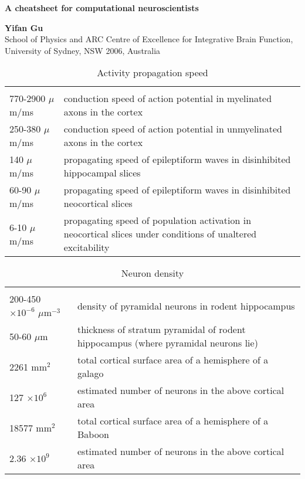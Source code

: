\documentclass[a4paper, 10pt]{article}
\begin{document}
{\centering\doublespacing
\Large{\textbf{A cheatsheet for computational neuroscientists}} 

\normalsize{\textbf{Yifan Gu} \\
\small{{School of Physics and ARC Centre of Excellence for Integrative Brain Function, \\
University of Sydney, NSW 2006, Australia} }	
\date{\today} 
\par
}
}


\begin{table}[h]
\captionsetup{font=small}
\footnotesize
\centering
\begin{tabular}[c]{p{3cm}p{6cm}}
\hline \\
770-2900 $\mu$m/ms &  conduction speed of action potential in myelinated axons in the cortex  \cite{debanne2011axon} \\
250-380 $\mu$m/ms & conduction speed of action potential in unmyelinated axons in the cortex  \cite{debanne2011axon} \\
140 $\mu$m/ms &  propagating speed of epileptiform waves in disinhibited hippocampal slices  \cite{miles1988spread} \\
60-90 $\mu$m/ms &  propagating speed of epileptiform waves in disinhibited neocortical slices  \cite{pinto2005initiation, chervin1988periodicity} \\
6-10 $\mu$m/ms & propagating speed of population activation in neocortical slices under conditions of
unaltered excitability   \cite{wu1999propagating} \\
\hline
\end{tabular}
\caption{Activity propagation speed}
\end{table}


\begin{table}[h]
\captionsetup{font=small}
\footnotesize
\centering
\begin{tabular}[c]{p{3cm}p{6cm}}
\hline \\
200-450 $\times 10^{-6}$  $\mu$m$^{-3}$ & density of pyramidal neurons in rodent hippocampus \cite{jinno2010stereological} \\
50-60  $\mu$m & thickness of stratum pyramidal of rodent hippocampus (where pyramidal neurons lie) \cite{ghafari2014prenatal} \\
2261 mm$^2$ & total cortical surface area of a hemisphere of a galago \citep{collins2010neuron} \\
127 $\times 10^{6}$ & estimated number of neurons in the above cortical area \citep{collins2010neuron} \\
18577 mm$^2$ & total cortical surface area of a hemisphere of a Baboon \citep{collins2010neuron} \\
2.36 $\times 10^{9}$ & estimated number of neurons in the above cortical area \citep{collins2010neuron} \\
\hline
\end{tabular}
\caption{Neuron density}
\end{table}
\end{document}
